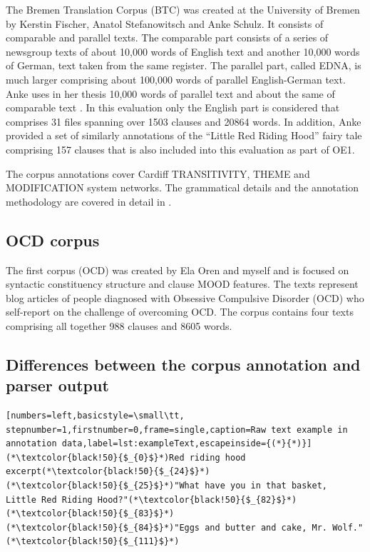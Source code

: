     The Bremen Translation Corpus (BTC) was created at the University of Bremen by Kerstin Fischer, Anatol Stefanowitsch and Anke Schulz. It consists of comparable and parallel texts. The comparable part consists of a series of newsgroup texts of about 10,000 words of English text and another 10,000 words of German, text taken from the same register. The parallel part, called EDNA, is much larger comprising about 100,000 words of parallel English-German text. Anke uses in her thesis 10,000 words of parallel text and about the same of comparable text \citep[31]{schulz2015me}. In this evaluation only the English part is considered that comprises 31 files spanning over 1503 clauses and 20864 words. In addition, Anke provided a set of similarly annotations of the ``Little Red Riding Hood'' fairy tale comprising 157 clauses that is also included into this evaluation as part of OE1. 
    
    The corpus annotations cover Cardiff TRANSITIVITY, THEME and MODIFICATION system networks. The grammatical details and the annotation methodology are covered in detail in \citet{schulz2015me}.

\subsection{OCD corpus}

     The first corpus (OCD) was created by Ela Oren and myself and is focused on syntactic constituency structure and clause MOOD features. The texts represent blog articles of people diagnosed with Obsessive Compulsive Disorder (OCD) who self-report on the challenge of overcoming OCD. The corpus contains four texts comprising all together 988 clauses and 8605 words. 

\subsection{Differences between the corpus annotation and parser output}
\label{sec:differences}

\begin{minipage}{\linewidth}
\begin{lstlisting}[numbers=left,basicstyle=\small\tt, stepnumber=1,firstnumber=0,frame=single,caption=Raw text example in annotation data,label=lst:exampleText,escapeinside={(*}{*)}]
(*\textcolor{black!50}{$_{0}$}*)Red riding hood excerpt(*\textcolor{black!50}{$_{24}$}*)
(*\textcolor{black!50}{$_{25}$}*)"What have you in that basket,   Little Red Riding Hood?"(*\textcolor{black!50}{$_{82}$}*)
(*\textcolor{black!50}{$_{83}$}*)
(*\textcolor{black!50}{$_{84}$}*)"Eggs and butter and cake, Mr. Wolf."(*\textcolor{black!50}{$_{111}$}*)
\end{lstlisting}
\end{minipage}

